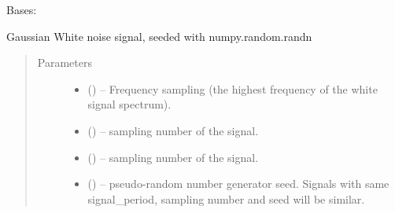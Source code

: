\documentclass[letterpaper,10pt,english]{sphinxmanual}
\begin{document}
\begin{fulllineitems}
\label{\detokenize{triflow.plugins:triflow.plugins.signals.GaussianWhiteNoise}}
Bases: {\hyperref[\detokenize{triflow.plugins:triflow.plugins.signals.Signal}]{}}

Gaussian White noise signal, seeded with numpy.random.randn
\begin{quote}\begin{description}
\item[{Parameters}] \leavevmode\begin{itemize}
\item {} 
 () -- Frequency sampling (the highest frequency of the white signal spectrum).

\item {} 
 (\sphinxstyleliteralemphasis{, }\sphinxstyleliteralemphasis{, }) -- sampling number of the signal.

\item {} 
 (\sphinxstyleliteralemphasis{, }\sphinxstyleliteralemphasis{, }) -- sampling number of the signal.

\item {} 
 (\sphinxstyleliteralemphasis{, }) -- pseudo-random number generator seed. Signals with same signal\_period, sampling number and seed will be similar.

\end{itemize}


\end{description}
\end{quote}
\end{fulllineitems}
\end{document}
